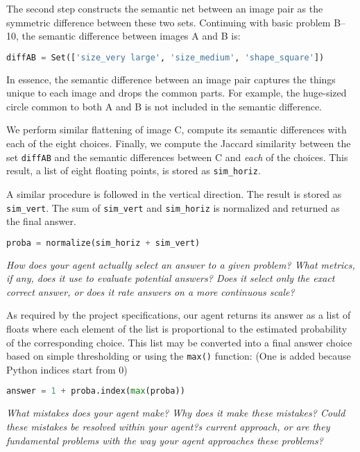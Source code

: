 \documentclass[10pt,letterpaper]{article}
\newcommand{\mypar}{\par{\vspace{0.2cm}}}
\newcommand{\rubric}[1]{\mypar{}\textcolor{mygray}{\emph{#1}}\mypar{}}
\begin{document}
The second step constructs the semantic net between an image pair as the symmetric difference between these two sets. Continuing with basic problem B--10, the semantic difference between images A and B is:

\begin{small}
\begin{lstlisting}[language=python]
diffAB = Set(['size_very large', 'size_medium', 'shape_square'])
\end{lstlisting}
\end{small}

In essence, the semantic difference between an image pair captures the things unique to each image and drops the common parts. For example, the huge-sized circle common to both A and B is not included in the semantic difference. 

We perform similar flattening of image C, compute its semantic differences with each of the eight choices. Finally, we compute the Jaccard similarity between the set {\tt diffAB} and the semantic differences between C and {\em each} of the choices.  This result, a list of eight floating points, is stored as {\tt sim\_horiz}.

A similar procedure is followed in the vertical direction. The result is stored as {\tt sim\_vert}. The sum of {\tt sim\_vert} and {\tt sim\_horiz} is normalized and returned as the final answer. 

\begin{small}
\begin{lstlisting}[language=python]
proba = normalize(sim_horiz + sim_vert)
\end{lstlisting}
\end{small}

\rubric{How does your agent actually select an answer to a given problem? What metrics, if any, does it use to evaluate potential answers? Does it select only the exact correct answer, or does it rate answers on a more continuous scale?}

As required by the project specifications, our agent returns its answer as a list of floats where each element of the list is proportional to the estimated probability of the corresponding choice. This list may be converted into a final answer choice based on simple thresholding or using the {\tt max()} function: (One is added because Python indices start from 0)

\begin{small}
\begin{lstlisting}[language=python]
answer = 1 + proba.index(max(proba)) 
\end{lstlisting}
\end{small}
\rubric{What mistakes does your agent make? Why does it make these mistakes? Could these mistakes be resolved within your agent?s current approach, or are they fundamental problems with the way your agent approaches these problems?}
\end{document}
